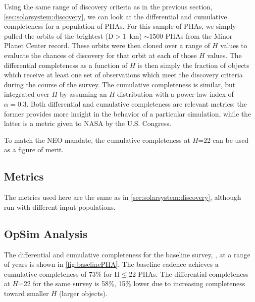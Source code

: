 Using the same range of discovery criteria as in the previous section,
\ref{sec:solarsystem:discovery}, we can look at the differential and
cumulative completeness for a population of PHAs. For this sample of
PHAs, we simply pulled the orbits of the brightest (D$>$1~km)
$\sim1500$ PHAs from the Minor Planet Center record. These orbits were
then cloned over a range of $H$ values to evaluate the chances of
discovery for that orbit at each of those $H$ values. The differential
completeness as a function of $H$ is then simply the fraction of
objects which receive at least one set of observations which meet the
discovery criteria during the course of the survey. The cumulative
completeness is similar, but integrated over $H$ by assuming an $H$
distribution with a power-law index of $\alpha=0.3$. Both
differential and cumulative completeness are relevant metrics: the
former provides more insight in the behavior of a particular
simulation, while the latter is a metric given to NASA by the U.S.
Congress.

To match the NEO mandate, the cumulative completeness at $H$=22 can be
used as a figure of merit.


\subsection{Metrics}
\label{sec:\secname:metrics}

The metrics used here are the same as in
\ref{sec:solarsystem:discovery}, although run with different input populations.


\subsection{OpSim Analysis}
\label{sec:\secname:analysis}

The differential and cumulative completeness for the baseline survey,
, at a range of years is shown in
\autoref{fig:baselinePHA}. The baseline cadence achieves a cumulative completeness of 73\% for
H$\le$22 PHAs. The differential completeness at $H$=22 for the same
survey is 58\%, 15\% lower due to increasing completeness toward
smaller $H$ (larger objects).

